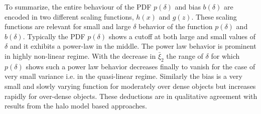 \documentclass[usenatbib]{mn2e}
\begin{document}
To summarize, the entire behaviour of the PDF
 $p(\delta)$ and bias $b(\delta)$ are
encoded in two different scaling functions, $h(x)$ and $g(z)$. 
These scaling functions are relevant for small and large $\delta$ behavior
of the function $p(\delta)$ and $b(\delta)$. Typically the PDF
$p(\delta)$ shows a cutoff at
both large and small values of $\delta$ and it exhibits a
power-law in the middle. The power law behavior is prominent in highly non-linear
regime. With the decrease in $\bar \xi_2$ the range of $\delta$ 
for which $p(\delta)$ shows such a power law behavior decreases
finally to vanish for the case of very small variance i.e. in the
quasi-linear regime. Similarly the bias is a very small and slowly
varying function for moderately over dense objects but increases
rapidly for over-dense objects. These deductions are in qualitative agreement 
with results from the halo model based approaches.
\end{document}

